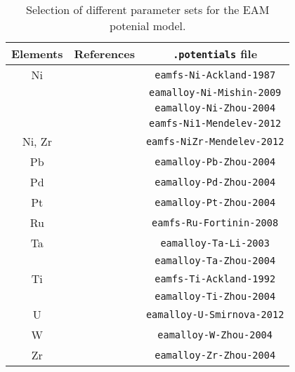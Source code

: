 \begin{table}
  \caption{Selection of different parameter sets for the EAM potenial model.}
  \label{tab:EAM-B}
  {\footnotesize
    \begin{center}
      \begin{tabular}{ccc}
        Elements & References & \texttt{.potentials} file\\\hline
        Ni & \cite{ackland1987simple} & \verb+eamfs-Ni-Ackland-1987+\\
        & \cite{mishin1999interatomic} & \verb+eamalloy-Ni-Mishin-2009+\\
        & \cite{zhou2004misfit} & \verb+eamalloy-Ni-Zhou-2004+\\\hline
        & \cite{mendelev2012development} & \verb+eamfs-Ni1-Mendelev-2012+\\\hline        
        Ni, Zr & \cite{mendelev2012development} & \verb+eamfs-NiZr-Mendelev-2012+\\\hline
        Pb & \cite{zhou2004misfit} & \verb+eamalloy-Pb-Zhou-2004+\\\hline
        Pd & \cite{zhou2004misfit} & \verb+eamalloy-Pd-Zhou-2004+\\\hline
        Pt & \cite{zhou2004misfit} & \verb+eamalloy-Pt-Zhou-2004+\\\hline
        Ru & \cite{fortini2008asperity} & \verb+eamfs-Ru-Fortinin-2008+\\\hline
        Ta & \cite{li2003embedded} & \verb+eamalloy-Ta-Li-2003+\\
        & \cite{zhou2004misfit} & \verb+eamalloy-Ta-Zhou-2004+\\\hline
        Ti & \cite{ackland1992theoretical} & \verb+eamfs-Ti-Ackland-1992+\\
        & \cite{zhou2004misfit} & \verb+eamalloy-Ti-Zhou-2004+\\\hline
        U & \cite{smirnova2012interatomic} & \verb+eamalloy-U-Smirnova-2012+\\\hline
        W & \cite{zhou2004misfit} & \verb+eamalloy-W-Zhou-2004+\\\hline
        Zr & \cite{zhou2004misfit} & \verb+eamalloy-Zr-Zhou-2004+\\\hline
      \end{tabular}
    \end{center}
  }
\end{table}


